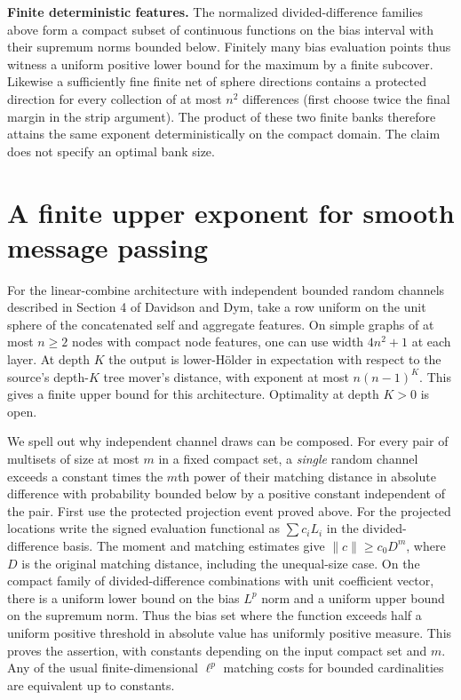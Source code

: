 \documentclass[10pt]{article}
\begin{document}
\textbf{Finite deterministic features.} The normalized divided-difference families above form a compact subset of continuous functions on the bias interval with their supremum norms bounded below. Finitely many bias evaluation points thus witness a uniform positive lower bound for the maximum by a finite subcover. Likewise a sufficiently fine finite net of sphere directions contains a protected direction for every collection of at most $n^2$ differences (first choose twice the final margin in the strip argument). The product of these two finite banks therefore attains the same exponent deterministically on the compact domain. The claim does not specify an optimal bank size.
\section*{A finite upper exponent for smooth message passing}
For the linear-combine architecture with independent bounded random channels described in Section 4 of Davidson and Dym, take a row uniform on the unit sphere of the concatenated self and aggregate features. On simple graphs of at most $n\ge2$ nodes with compact node features, one can use width $4n^2+1$ at each layer. At depth $K$ the output is lower-H\"older in expectation with respect to the source's depth-$K$ tree mover's distance, with exponent at most $n(n-1)^K$. This gives a finite upper bound for this architecture. Optimality at depth $K>0$ is open.

We spell out why independent channel draws can be composed. For every pair of multisets of size at most $m$ in a fixed compact set, a \emph{single} random channel exceeds a constant times the $m$th power of their matching distance in absolute difference with probability bounded below by a positive constant independent of the pair. First use the protected projection event proved above. For the projected locations write the signed evaluation functional as $\sum c_i L_i$ in the divided-difference basis. The moment and matching estimates give $\|c\|\ge c_0 D^m$, where $D$ is the original matching distance, including the unequal-size case. On the compact family of divided-difference combinations with unit coefficient vector, there is a uniform lower bound on the bias $L^p$ norm and a uniform upper bound on the supremum norm. Thus the bias set where the function exceeds half a uniform positive threshold in absolute value has uniformly positive measure. This proves the assertion, with constants depending on the input compact set and $m$. Any of the usual finite-dimensional $\ell^p$ matching costs for bounded cardinalities are equivalent up to constants.
\end{document}
